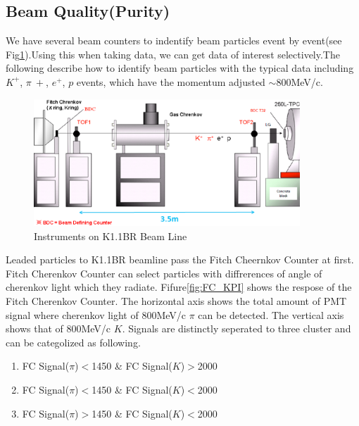 \subsection{Beam Quality(Purity)}

We have several beam counters to indentify beam particles event by event(see Fig\ref{fig:Beamline}).Using this when taking data, we can get data of interest selectively.The following describe how to identify beam particles with the typical data including $K^{+}$, $\pi~{+}$, $e^{+}$, $p$ events, which have the momentum adjusted $\sim$800MeV/c.\\

\begin{figure}[htbp]
  \centering
  \includegraphics[width=10cm,clip]{fig/Beamline.eps}
  \caption{Instruments on K1.1BR Beam Line}
  \label{fig:Beamline}
\end{figure}

Leaded particles to K1.1BR beamline pass the Fitch Cheernkov Counter at first.
Fitch Cherenkov Counter can select particles with diffrerences of angle of cherenkov light which they radiate.
Fifure\ref{fig:FC_KPI} shows the respose of the Fitch Cherenkov Counter.
The horizontal axis shows the total amount of PMT signal where cherenkov light of 800MeV/c $\pi$ can be detected.
The vertical axis shows that of 800MeV/c $K$.
Signals are distinctly seperated to three cluster and can be categolized as following.\\

\begin{enumerate}
\item FC Signal($\pi$)$<$1450 \& FC Signal($K$)$>$2000 \\
\item FC Signal($\pi$)$<$1450 \& FC Signal($K$)$<$2000 \\
\item FC Signal($\pi$)$>$1450 \& FC Signal($K$)$<$2000 \\
\end{enumerate}

